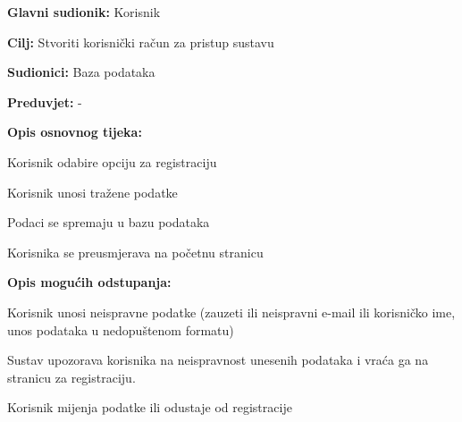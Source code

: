 					\noindent {}
					\begin{packed_item}
	
						\item \textbf{Glavni sudionik: }Korisnik
						\item  \textbf{Cilj: }Stvoriti korisnički račun za pristup sustavu
						\item  \textbf{Sudionici:} Baza podataka
						\item  \textbf{Preduvjet:} -
						\item  \textbf{Opis osnovnog tijeka:}
						
						\item[] \begin{packed_enum}
	
							\item 	Korisnik odabire opciju za registraciju
							\item  Korisnik unosi tražene podatke
							\item Podaci se spremaju u bazu podataka
							\item Korisnika se preusmjerava na početnu stranicu
							
						\end{packed_enum}
						
						\item  \textbf{Opis mogućih odstupanja:}
						
						\item[] \begin{packed_item}
	
							\item[2.a] Korisnik unosi neispravne podatke (zauzeti ili neispravni e-mail ili korisničko ime, unos podataka u nedopuštenom formatu)
							\item[] \begin{packed_enum}
								
								\item Sustav upozorava korisnika na neispravnost unesenih podataka i vraća ga na stranicu za registraciju.
								\item Korisnik mijenja podatke ili odustaje od registracije
								
							\end{packed_enum}
						\end{packed_item}
					\end{packed_item}
				
